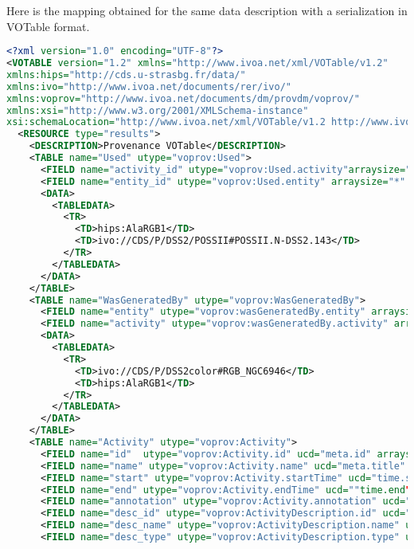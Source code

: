 Here is the mapping obtained for the same data description with a serialization in VOTable  format.

\begin{lstlisting}[language=XML, caption= VOTable serialization example for a color composition activity]
<?xml version="1.0" encoding="UTF-8"?>
<VOTABLE version="1.2" xmlns="http://www.ivoa.net/xml/VOTable/v1.2" 
xmlns:hips="http://cds.u-strasbg.fr/data/" 
xmlns:ivo="http://www.ivoa.net/documents/rer/ivo/" 
xmlns:voprov="http://www.ivoa.net/documents/dm/provdm/voprov/" 
xmlns:xsi="http://www.w3.org/2001/XMLSchema-instance" 
xsi:schemaLocation="http://www.ivoa.net/xml/VOTable/v1.2 http://www.ivoa.net/xml/VOTable/VOTable-1.2.xsd">
  <RESOURCE type="results">
    <DESCRIPTION>Provenance VOTable</DESCRIPTION>
    <TABLE name="Used" utype="voprov:Used">
      <FIELD name="activity_id" utype="voprov:Used.activity"arraysize="*" ucd="meta.id" datatype="char" />
      <FIELD name="entity_id" utype="voprov:Used.entity" arraysize="*" ucd="meta.id" datatype="char" />
      <DATA>
        <TABLEDATA>
          <TR>
            <TD>hips:AlaRGB1</TD>
            <TD>ivo://CDS/P/DSS2/POSSII#POSSII.N-DSS2.143</TD>
          </TR>
        </TABLEDATA>
      </DATA>
    </TABLE>
    <TABLE name="WasGeneratedBy" utype="voprov:WasGeneratedBy">
      <FIELD name="entity" utype="voprov:wasGeneratedBy.entity" arraysize="*" datatype="char"  ucd="meta.id"/>
      <FIELD name="activity" utype="voprov:wasGeneratedBy.activity" arraysize="*" datatype="char" ucd="meta.id"/>
      <DATA>
        <TABLEDATA>
          <TR>
            <TD>ivo://CDS/P/DSS2color#RGB_NGC6946</TD>
            <TD>hips:AlaRGB1</TD>
          </TR>
        </TABLEDATA>
      </DATA>
    </TABLE>
    <TABLE name="Activity" utype="voprov:Activity">
      <FIELD name="id"  utype="voprov:Activity.id" ucd="meta.id" arraysize="*" datatype="char" />
      <FIELD name="name" utype="voprov:Activity.name" ucd="meta.title" arraysize="*" datatype="char" />
      <FIELD name="start" utype="voprov:Activity.startTime" ucd="time.start" arraysize="*" datatype="char" />
      <FIELD name="end" utype="voprov:Activity.endTime" ucd=""time.end" arraysize="*" datatype="char"  "/>
      <FIELD name="annotation" utype="voprov:Activity.annotation" ucd="meta.description" arraysize="*" datatype="char" />
      <FIELD name="desc_id" utype="voprov:ActivityDescription.id" ucd="meta.id" arraysize="*" datatype="char" />
      <FIELD name="desc_name" utype="voprov:ActivityDescription.name" ucd="meta.title" arraysize="*" datatype="char" />
      <FIELD name="desc_type" utype="voprov:ActivityDescription.type" ucd="meta.code.class" arraysize="*" datatype="char" />

\end{lstlisting}
